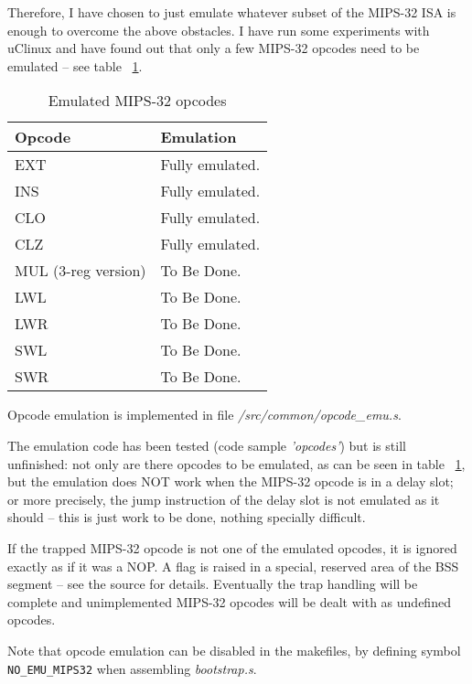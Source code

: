     Therefore, I have chosen to just emulate whatever subset of the 
    MIPS-32 ISA is enough to overcome the above obstacles. I have run some 
    experiments with uClinux and have found out that only a few MIPS-32 opcodes 
    need to be emulated -- see table ~\ref{tab_emulated_opcodes}.
    
    \begin{table}[h]
    \caption{Emulated MIPS-32 opcodes\label{tab_emulated_opcodes}}
    \begin{tabularx}{\textwidth}{ l|X }
    \toprule
    Opcode & Emulation \\
    \midrule
    EXT                 & Fully emulated. \\
    INS                 & Fully emulated. \\
    CLO                 & Fully emulated. \\
    CLZ                 & Fully emulated. \\
    \midrule
    MUL (3-reg version) & To Be Done. \\
    LWL                 & To Be Done. \\
    LWR                 & To Be Done. \\
    SWL                 & To Be Done. \\
    SWR                 & To Be Done. \\
    \bottomrule
    \end{tabularx}
    \end{table}   

    Opcode emulation is implemented in file \emph{/src/common/opcode\_emu.s}.
    
    The emulation code has been tested (code sample \emph{'opcodes'}) but is
    still unfinished: not only are there opcodes to be emulated, as can 
    be seen in table ~\ref{tab_emulated_opcodes}, but the emulation does NOT
    work when the MIPS-32 opcode is in a delay slot; or more precisely, the 
    jump instruction of the delay slot is not emulated as it should -- this is 
    just work to be done, nothing specially difficult.
    
    
    If the trapped MIPS-32 opcode is not one of the emulated opcodes, it is
    ignored exactly as if it was a NOP. A flag is raised in a special, reserved
    area of the BSS segment -- see the source for details. Eventually the trap 
    handling will be complete and unimplemented MIPS-32 opcodes will be dealt 
    with as undefined opcodes.
    
    Note that opcode emulation can be disabled in the makefiles, by defining 
    symbol \texttt{NO\_EMU\_MIPS32} when assembling \emph{bootstrap.s}.
    

